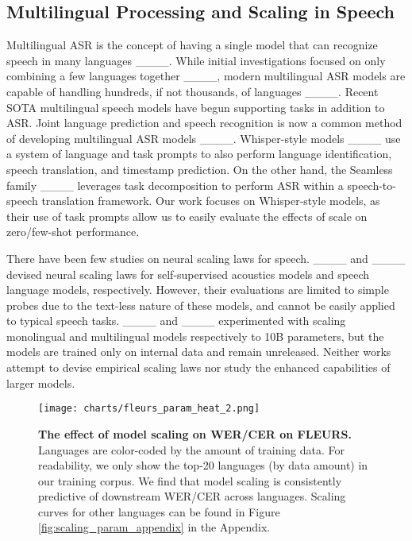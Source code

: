 \subsection{Multilingual Processing and Scaling in Speech}
\vspace{-0.2cm}

Multilingual ASR is the concept of having a single model that can recognize speech in many languages ____. While initial investigations focused on only combining a few languages together ____, modern multilingual ASR models are capable of handling hundreds, if not thousands, of languages ____. Recent SOTA multilingual speech models have begun supporting tasks in addition to ASR. Joint language prediction and speech recognition is now a common method of developing multilingual ASR models ____. Whisper-style models ____ use a system of language and task prompts to also perform language identification, speech translation, and timestamp prediction. On the other hand, the Seamless family ____ leverages task decomposition to perform ASR within a speech-to-speech translation framework. Our work focuses on Whisper-style models, as their use of task prompts allow us to easily evaluate the effects of scale on zero/few-shot performance.

There have been few studies on neural scaling laws for speech. ____ and ____ devised neural scaling laws for self-supervised acoustics models and speech language models, respectively. However, their evaluations are limited to simple probes due to the text-less nature of these models, and cannot be easily applied to typical speech tasks. ____ and ____ experimented with scaling monolingual and multilingual models respectively to 10B parameters, but the models are trained only on internal data and remain unreleased. Neither works attempt to devise empirical scaling laws nor study the enhanced capabilities of larger models.


\begin{figure*}
    \centering
    \texttt{[image: charts/fleurs\_param\_heat\_2.png]}
    \vspace{-0.4cm}
    \caption{\textbf{The effect of model scaling on WER/CER on FLEURS.} Languages are color-coded by the amount of training data. For readability, we only show the top-20 languages (by data amount) in our training corpus. We find that model scaling is consistently predictive of downstream WER/CER across languages. Scaling curves for other languages can be found in Figure \ref{fig:scaling_param_appendix} in the Appendix.}
    \vspace{-0.4cm}
    \label{fig:scaling_param}
\end{figure*}

\vspace{-0.2cm}